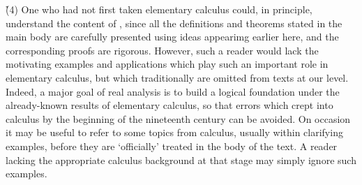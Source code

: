 \V

      \h \h (4) One who had not first taken elementary calculus could, in principle, understand the content of {\ThisText},
    since all the definitions and theorems stated in the main body are carefully presented using ideas appearimg earlier here, and the corresponding proofs are rigorous.
    However, such a reader would lack the motivating examples and applications which play such an important role in elementary calculus,
    but which traditionally are omitted from texts at our level. Indeed, a major goal of real analysis is to build a logical foundation under the already-known results of elementary calculus,
    so that errors which crept into calculus by the beginning of the nineteenth century can be avoided.
    On occasion it may be useful to refer to some topics from calculus, usually within clarifying examples, before they are `officially' treated in the body of the text.
    A reader lacking  the appropriate calculus background at that stage may simply ignore such examples.

\VV


